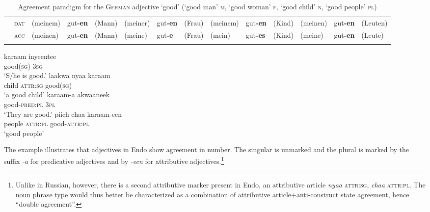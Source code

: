 \begin{sidewaystable}
\begin{scriptsize}
\begin{tabular}{ll lll lll lll lll}
&\textsc{dat}&(meinem)&gut\textbf{-en}&(Mann)&(meiner)&gut\textbf{-en}&(Frau)&(meinem)&gut\textbf{-en}&(Kind)&(meinen)&gut\textbf{-en}&(Leuten)\\		
&\textsc{acc}&(meinen)&gut\textbf{-en}&(Mann)&(meine)&gut\textbf{-e}&(Frau)&(mein)&gut\textbf{-es}&(Kind)&(meine)&gut\textbf{-en}&(Leute)\\	
\lspbottomrule
\end{tabular}
\end{scriptsize}
\caption[Adjective paradigm for \textsc{German}]{Agreement paradigm for the \textsc{German} adjective ‘good’ (‘good man’ \textsc{m}, ‘good woman’ \textsc{f}, ‘good child’ \textsc{n}, ‘good people’ \textsc{pl})} \label{german agr}
\end{sidewaystable}

\begin{exe}
\ex
{}
\begin{xlist}
\ex
\gll 	karaam 	inyeentee\\
	good(\textsc{sg}) \textsc{3sg}\\	
\glt	‘S/he is good.’
\ex	
\gll 	laakwa 	nyaa 		karaam\\
	child 	\textsc{attr:sg} 	good(\textsc{sg})\\	
\glt	‘a good child’
\ex	
\gll 	karaam-a 	akwaaneek\\
	good-\textsc{pred:pl} 	\textsc{3pl}\\
\glt	‘They are good.’
\ex	
\gll 	piich 	chaa 		karaam-een\\
	people 	\textsc{attr:pl} 	good-\textsc{attr:pl}\\
\glt	‘good people’
\end{xlist}
\end{exe}
The example illustrates that adjectives in Endo show agreement in number. The singular is unmarked and the plural is marked by the suffix \textit{-a} for predicative adjectives and by \textit{-een} for attributive adjectives.\footnote{Unlike in Russian, however, there is a second attributive marker present in Endo, an attributive article \textit{nyaa} \textsc{attr:sg}, \textit{chaa} \textsc{attr:pl}. The noun phrase type would thus better be characterized as a combination of attributive article+anti\hyp{}construct state agreement, hence “double agreement”.}

